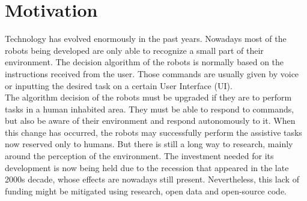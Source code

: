
\section{Motivation}

Technology has evolved enormously in the past years. 
Nowadays most of the robots being developed are only able to recognize a small part of their environment. 
The decision algorithm of the robots is normally based on the instructions received from the user. 
Those commands are usually given by voice or inputting the desired task on a certain User Interface (UI).
\\

The algorithm decision of the robots must be upgraded if they are to perform tasks in a human inhabited area. %
They must be able to respond to commands, but also be aware of their environment and respond autonomously to it. 
When this change has occurred, the robots may successfully perform the assistive tasks now reserved only to humans. 
But there is still a long way to research, mainly around the perception of the environment. 
The investment needed for its development is now being held due to the recession that appeared in the late 2000s decade, whose effects are nowadays still present. 
Nevertheless, this lack of funding might be mitigated using research, open data and open-source code. 

